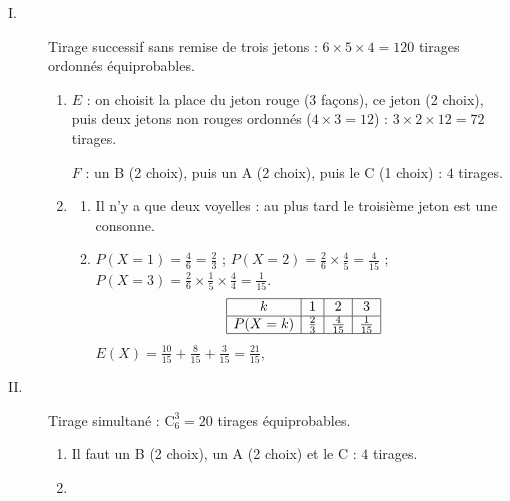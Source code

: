 \begin{description}
   \item[I.] Tirage successif sans remise de trois jetons : $6 \times 5 \times 4 = 120$ tirages ordonn\'es \'equiprobables.
      \begin{enumerate}
         \item {}
            $E$ : on choisit la place du jeton rouge (3 fa\c{c}ons), ce jeton (2 choix), puis deux jetons non rouges ordonn\'es
            ($4 \times 3 = 12$) : $3 \times 2 \times 12 = 72$ tirages. 

            $F$ : un B (2 choix), puis un A (2 choix), puis le C (1 choix) : $4$ tirages. 
         \item
            \begin{enumerate}
               \item {}
                  Il n'y a que deux voyelles : au plus tard le troisi\`eme jeton est une consonne. 
               \item {}
                  $P(X = 1) = \frac{4}{6} = \frac{2}{3}$ ; $P(X = 2) = \frac{2}{6}\times\frac{4}{5} = \frac{4}{15}$ ;
                  $P(X = 3) = \frac{2}{6}\times\frac{1}{5}\times\frac{4}{4} = \frac{1}{15}$.
                  \[
                     \begin{array}{|c|c|c|c|}
                        \hline
                        k & 1 & 2 & 3 \\ \hline
                        P(X = k) & \frac{2}{3} & \frac{4}{15} & \frac{1}{15} \\ \hline
                     \end{array}
                  \]
                  $E(X) = \frac{10}{15} + \frac{8}{15} + \frac{3}{15} = \frac{21}{15}$, 
            \end{enumerate}
      \end{enumerate}
   \item[II.] Tirage simultan\'e : $\mathrm{C}_6^3 = 20$ tirages \'equiprobables.
      \begin{enumerate}
         \item {}
            Il faut un B (2 choix), un A (2 choix) et le C : $4$ tirages. 
         \item

\end{enumerate}
\end{description}
